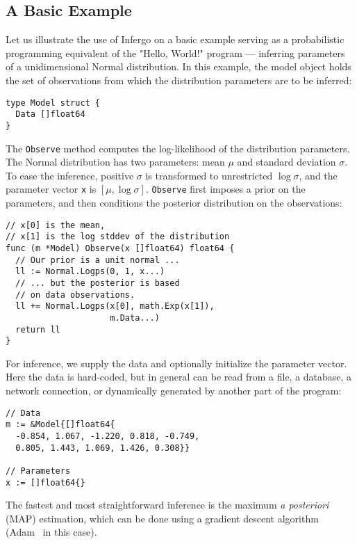\documentclass[sigplan,review,10pt,anonymous]{acmart}
\begin{document}
\begin{sloppypar}
\subsection{A Basic Example}
\label{sec:basic-example}

Let us illustrate the use of Infergo on a basic example serving
as a probabilistic programming equivalent of the "Hello, World!"
program --- inferring parameters of a unidimensional Normal
distribution. In this example, the model object holds the set of
observations from which the distribution parameters are to be
inferred:
\begin{lstlisting}
type Model struct {
  Data []float64
}
\end{lstlisting}

The \lstinline{Observe} method computes the log-likelihood of
the distribution parameters. The Normal distribution has two
parameters: mean $\mu$ and standard deviation $\sigma$. To ease
the inference, positive $\sigma$ is transformed to unrestricted
$\log \sigma$, and the parameter vector \lstinline{x} is $[\mu,
\log \sigma]$. \lstinline{Observe} first imposes a prior on the
parameters, and then conditions the posterior distribution on
the observations:

\begin{lstlisting}
// x[0] is the mean,
// x[1] is the log stddev of the distribution
func (m *Model) Observe(x []float64) float64 {
  // Our prior is a unit normal ...
  ll := Normal.Logps(0, 1, x...)
  // ... but the posterior is based 
  // on data observations.
  ll += Normal.Logps(x[0], math.Exp(x[1]),
                     m.Data...)
  return ll
}
\end{lstlisting}

For inference, we supply the data and optionally initialize the
parameter vector. Here the data is hard-coded, but in general
can be read from a file, a database, a network connection,
or dynamically generated by another part of the program:

\begin{lstlisting}
// Data
m := &Model{[]float64{
  -0.854, 1.067, -1.220, 0.818, -0.749,
  0.805, 1.443, 1.069, 1.426, 0.308}}

// Parameters
x := []float64{}
\end{lstlisting}
  
The fastest and most straightforward inference is the maximum
\textit{a posteriori} (MAP) estimation, which can be done using
a gradient descent algorithm (Adam~\cite{KB15} in this case).


\end{sloppypar}
\end{document}

